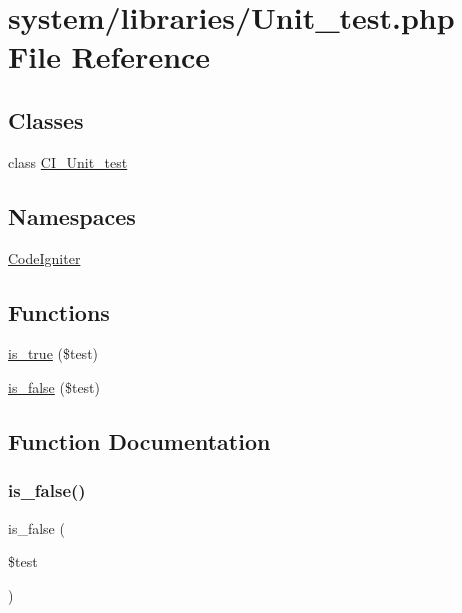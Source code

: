\hypertarget{_unit__test_8php}{}\section{system/libraries/\+Unit\+\_\+test.php File Reference}
\label{_unit__test_8php}
\subsection*{Classes}
\begin{DoxyCompactItemize}
\item 
class \mbox{\hyperlink{class_c_i___unit__test}{C\+I\+\_\+\+Unit\+\_\+test}}
\end{DoxyCompactItemize}
\subsection*{Namespaces}
\begin{DoxyCompactItemize}
\item 
 \mbox{\hyperlink{namespace_code_igniter}{Code\+Igniter}}
\end{DoxyCompactItemize}
\subsection*{Functions}
\begin{DoxyCompactItemize}
\item 
\mbox{\hyperlink{_unit__test_8php_acf75638429e85f5d2eb23c85ce46f85b}{is\+\_\+true}} (\$test)
\item 
\mbox{\hyperlink{_unit__test_8php_a2fdef4e023452d31fcf5b3085bc9b25f}{is\+\_\+false}} (\$test)
\end{DoxyCompactItemize}


\subsection{Function Documentation}
\mbox{\label{_unit__test_8php_a2fdef4e023452d31fcf5b3085bc9b25f}} 
\subsubsection{\texorpdfstring{is\+\_\+false()}{is\_false()}}
{\footnotesize\ttfamily is\+\_\+false (\begin{DoxyParamCaption}\item[{}]{\$test }\end{DoxyParamCaption})}


